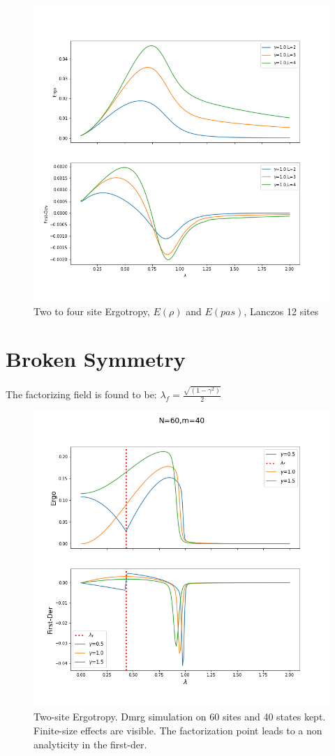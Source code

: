 \documentclass[12pt,a4paper]{book}
\theoremstyle{definition}
\begin{document}
\begin{figure}[h]
	\centering
	\includegraphics[width=0.7\linewidth]{graphs/ergo_lanczos}
	\caption{Two to four site Ergotropy, $E(\rho)$ and $E(pas)$, Lanczos 12 sites}
	\label{fig:ergolanczos}
\end{figure}


\clearpage
\section{Broken Symmetry}

The factorizing field is found to be: $\lambda_f= \frac{\sqrt{(1-\gamma^2)}}{2}$ \\
\begin{figure}[h]
	\centering
	\includegraphics[width=0.7\linewidth]{graphs/N60_m40_simbreak_g_051015}
	\caption{Two-site Ergotropy. Dmrg simulation on 60 sites and 40 states kept. Finite-size effects are visible. The factorization point leads to a non analyticity in the first-der. }
	\label{fig:n60m40simbreakg051015}
\end{figure}
\end{document}
